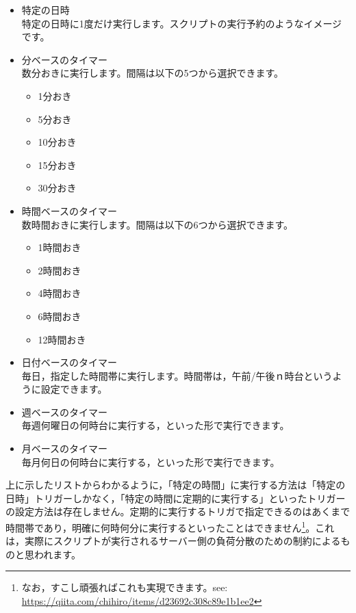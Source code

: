 \documentclass[uplatex,a4j]{jsarticle}
\begin{document}
\begin{itemize}
\item 特定の日時\\
特定の日時に1度だけ実行します。スクリプトの実行予約のようなイメージです。
\item 分ベースのタイマー\\
数分おきに実行します。間隔は以下の5つから選択できます。
\begin{itemize}
\item 1分おき
\item 5分おき
\item 10分おき
\item 15分おき
\item 30分おき
\end{itemize}
\item 時間ベースのタイマー\\
数時間おきに実行します。間隔は以下の6つから選択できます。
\begin{itemize}
\item 1時間おき
\item 2時間おき
\item 4時間おき
\item 6時間おき
\item 12時間おき
\end{itemize}
\item 日付ベースのタイマー\\
毎日，指定した時間帯に実行します。時間帯は，午前/午後ｎ時台というように設定できます。
\item 週ベースのタイマー\\
毎週何曜日の何時台に実行する，といった形で実行できます。
\item 月ベースのタイマー\\
毎月何日の何時台に実行する，といった形で実行できます。
\end{itemize}

上に示したリストからわかるように，「特定の時間」に実行する方法は「特定の日時」トリガーしかなく，「特定の時間に定期的に実行する」といったトリガーの設定方法は存在しません。定期的に実行するトリガで指定できるのはあくまで時間帯であり，明確に何時何分に実行するといったことはできません\footnote{なお，すこし頑張ればこれも実現できます。see: \href{https://qiita.com/chihiro/items/d23692c308c89e1b1ee2}{https://qiita.com/chihiro/items/d23692c308c89e1b1ee2}}。これは，実際にスクリプトが実行されるサーバー側の負荷分散のための制約によるものと思われます。
\end{document}
